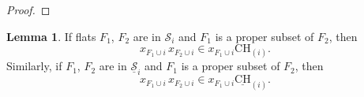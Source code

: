 \documentclass[11pt,reqno]{amsart}
\theoremstyle{definition}
\newtheorem{lemma}[theorem]{Lemma}
\theoremstyle{remark}
\renewcommand{\(}{\left(}
\renewcommand{\)}{\right)}
\newcommand{\<}{\left<}
\renewcommand{\>}{\right>}
\newcommand{\rk}{\operatorname{rk}}
\begin{document}
\begin{proof}
\end{proof}


\begin{lemma}\label{lem:multiplying summands}
If flats $F_1$, $F_2$ are in $\mathscr{S}_i$ and $F_1$ is a proper subset of $F_2$, then 
\[
x_{F_1\cup i}\,x_{F_2\cup i} \in x_{F_1\cup i}\mathrm{CH}_{(i)}.
\]
Similarly, if $F_1$, $F_2$ are in $\underline{\mathscr{S}}_i$ and $F_1$ is a proper subset of $F_2$, then 
\[
x_{F_1\cup i}\,x_{F_2\cup i} \in x_{F_1\cup i}\underline{\mathrm{CH}}_{(i)}.
\]
\end{lemma}
\end{document}
